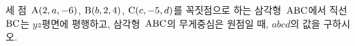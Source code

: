 세 점~$\mathrm{A}(2{,}\mkern3mu\mathopen{}a{,}\mkern3mu\mathopen{}-6)$, $\mathrm{B}(b{,}\mkern3mu\mathopen{}2{,}\mkern3mu\mathopen{}4)$, $\mathrm{C}(c{,}\mkern3mu\mathopen{}-5{,}\mkern3mu\mathopen{}d)$를 꼭짓점으로 하는 삼각형~$\mathrm{ABC}$에서 직선~$\mathrm{BC}$는 $yz$평면에 평행하고, 삼각형~$\mathrm{ABC}$의 무게중심은 원점일 때, $abcd$의 값을 구하시오.

